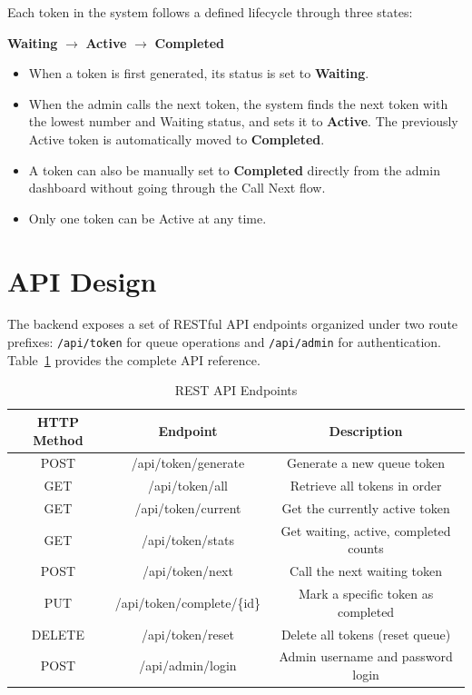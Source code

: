 Each token in the system follows a defined lifecycle through three states:

\begin{center}
\textbf{Waiting} $\rightarrow$ \textbf{Active} $\rightarrow$ \textbf{Completed}
\end{center}

\begin{itemize}
    \item When a token is first generated, its status is set to \textbf{Waiting}.
    \item When the admin calls the next token, the system finds the next token with the lowest number and Waiting status, and sets it to \textbf{Active}. The previously Active token is automatically moved to \textbf{Completed}.
    \item A token can also be manually set to \textbf{Completed} directly from the admin dashboard without going through the Call Next flow.
    \item Only one token can be Active at any time.
\end{itemize}

\section{API Design}

The backend exposes a set of RESTful API endpoints organized under two route prefixes: \texttt{/api/token} for queue operations and \texttt{/api/admin} for authentication. Table~\ref{tab:api} provides the complete API reference.

\begin{table}[htbp]
    \centering
    \begin{tabular}{|c|c|c|}
        \hline
        \textbf{HTTP Method} & \textbf{Endpoint} & \textbf{Description} \\
        \hline
        POST & /api/token/generate & Generate a new queue token \\
        \hline
        GET & /api/token/all & Retrieve all tokens in order \\
        \hline
        GET & /api/token/current & Get the currently active token \\
        \hline
        GET & /api/token/stats & Get waiting, active, completed counts \\
        \hline
        POST & /api/token/next & Call the next waiting token \\
        \hline
        PUT & /api/token/complete/\{id\} & Mark a specific token as completed \\
        \hline
        DELETE & /api/token/reset & Delete all tokens (reset queue) \\
        \hline
        POST & /api/admin/login & Admin username and password login \\
        \hline
    \end{tabular}
    \caption{REST API Endpoints}
    \label{tab:api}
\end{table}

